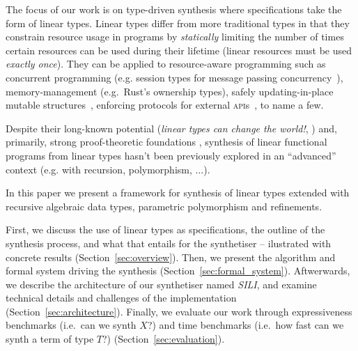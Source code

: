 \documentclass{llncs}
\newcommand{\synname}{\emph{SILI}}
\begin{document}
The focus of our work is on type-driven synthesis where specifications take the
form of linear types.
%
%
Linear types differ from more traditional types in that they constrain resource
usage in programs by \emph{statically} limiting the number of times certain
resources can be used during their lifetime (linear resources must be used
\emph{exactly once}).
%
They can be applied to resource-aware programming such as concurrent programming
(e.g. session types for message passing
concurrency~\cite{DBLP:journals/mscs/CairesPT16}), memory-management
(e.g.~Rust's ownership types), safely updating-in-place mutable
structures~\cite{Bernardy_2018}, enforcing protocols for external \textsc{api}s~\cite{Bernardy_2018}, to name a few.

Despite their long-known potential (\emph{linear types can change the
world!}\cite{Wadler90lineartypes}, \cite{DBLP:journals/mscs/CairesPT16,Bernardy_2018}) and,
primarily, strong proof-theoretic
foundations \cite{10.1093/logcom/2.3.297,DBLP:conf/cade/ChaudhuriP05,DBLP:journals/tcs/CervesatoHP00}, synthesis of linear functional programs
from linear types hasn't been previously explored in an ``advanced'' context (e.g.
with recursion, polymorphism, ...).

In this paper we present a framework for synthesis of linear types extended with
recursive algebraic data types, parametric polymorphism and refinements.

First, we discuss the use of linear types as specifications, the outline of the
synthesis process, and what that entails for the synthetiser -- ilustrated with
concrete results (Section~\ref{sec:overview}). Then, we present the
algorithm and formal system driving the synthesis
(Section~\ref{sec:formal_system}). Aftwerwards, we describe the architecture 
of our synthetiser named \synname, and examine technical details and challenges of the
implementation (Section~\ref{sec:architecture}). Finally, we evaluate our work
through expressiveness benchmarks (i.e.~can we synth $X$?) and time benchmarks
(i.e.~how fast can we synth a term of type $T$?) (Section~\ref{sec:evaluation}).
\end{document}
